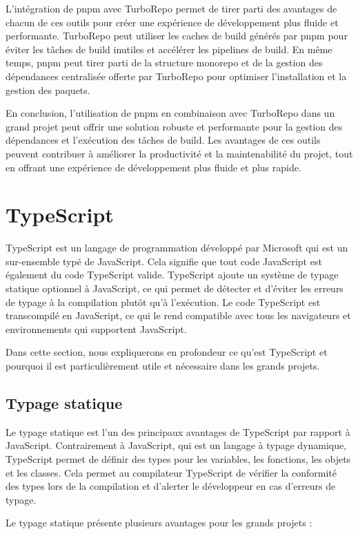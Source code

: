 L'intégration de pnpm avec TurboRepo permet de tirer parti des avantages de chacun de ces outils pour créer une expérience de développement plus fluide et performante. TurboRepo peut utiliser les caches de build générés par pnpm pour éviter les tâches de build inutiles et accélérer les pipelines de build. En même temps, pnpm peut tirer parti de la structure monorepo et de la gestion des dépendances centralisée offerte par TurboRepo pour optimiser l'installation et la gestion des paquets.

En conclusion, l'utilisation de pnpm en combinaison avec TurboRepo dans un grand projet peut offrir une solution robuste et performante pour la gestion des dépendances et l'exécution des tâches de build. Les avantages de ces outils peuvent contribuer à améliorer la productivité et la maintenabilité du projet, tout en offrant une expérience de développement plus fluide et plus rapide.


\section{TypeScript}
TypeScript est un langage de programmation développé par Microsoft qui est un sur-ensemble typé de JavaScript. Cela signifie que tout code JavaScript est également du code TypeScript valide. TypeScript ajoute un système de typage statique optionnel à JavaScript, ce qui permet de détecter et d'éviter les erreurs de typage à la compilation plutôt qu'à l'exécution. Le code TypeScript est transcompilé en JavaScript, ce qui le rend compatible avec tous les navigateurs et environnements qui supportent JavaScript.

Dans cette section, nous expliquerons en profondeur ce qu'est TypeScript et pourquoi il est particulièrement utile et nécessaire dans les grands projets.

\subsection{Typage statique}
Le typage statique est l'un des principaux avantages de TypeScript par rapport à JavaScript. Contrairement à JavaScript, qui est un langage à typage dynamique, TypeScript permet de définir des types pour les variables, les fonctions, les objets et les classes. Cela permet au compilateur TypeScript de vérifier la conformité des types lors de la compilation et d'alerter le développeur en cas d'erreurs de typage.

Le typage statique présente plusieurs avantages pour les grands projets :

